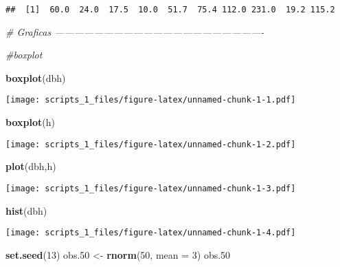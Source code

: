 \documentclass[
]{article}
\newenvironment{Shaded}{\begin{snugshade}}{\end{snugshade}}
\newcommand{\CommentTok}[1]{\textcolor[rgb]{0.56,0.35,0.01}{\textit{#1}}}
\newcommand{\DataTypeTok}[1]{\textcolor[rgb]{0.13,0.29,0.53}{#1}}
\newcommand{\DecValTok}[1]{\textcolor[rgb]{0.00,0.00,0.81}{#1}}
\newcommand{\FloatTok}[1]{\textcolor[rgb]{0.00,0.00,0.81}{#1}}
\newcommand{\KeywordTok}[1]{\textcolor[rgb]{0.13,0.29,0.53}{\textbf{#1}}}
\newcommand{\NormalTok}[1]{#1}
\newcommand{\StringTok}[1]{\textcolor[rgb]{0.31,0.60,0.02}{#1}}
\begin{document}
\begin{verbatim}
##  [1]  60.0  24.0  17.5  10.0  51.7  75.4 112.0 231.0  19.2 115.2
\end{verbatim}

\begin{Shaded}
\begin{Highlighting}[]
\CommentTok{# Graficas ----------------------------------------------------------------}


\CommentTok{#boxplot}

\KeywordTok{boxplot}\NormalTok{(dbh)}
\end{Highlighting}
\end{Shaded}

\texttt{[image: scripts\_1\_files/figure-latex/unnamed-chunk-1-1.pdf]}

\begin{Shaded}
\begin{Highlighting}[]
\KeywordTok{boxplot}\NormalTok{(h)}
\end{Highlighting}
\end{Shaded}

\texttt{[image: scripts\_1\_files/figure-latex/unnamed-chunk-1-2.pdf]}

\begin{Shaded}
\begin{Highlighting}[]
\KeywordTok{plot}\NormalTok{(dbh,h)}
\end{Highlighting}
\end{Shaded}

\texttt{[image: scripts\_1\_files/figure-latex/unnamed-chunk-1-3.pdf]}

\begin{Shaded}
\begin{Highlighting}[]
\KeywordTok{hist}\NormalTok{(dbh)}
\end{Highlighting}
\end{Shaded}

\texttt{[image: scripts\_1\_files/figure-latex/unnamed-chunk-1-4.pdf]}

\begin{Shaded}
\begin{Highlighting}[]
\KeywordTok{set.seed}\NormalTok{(}\DecValTok{13}\NormalTok{)}
\NormalTok{obs}\FloatTok{.50}\NormalTok{ <-}\StringTok{ }\KeywordTok{rnorm}\NormalTok{(}\DecValTok{50}\NormalTok{, }\DataTypeTok{mean =} \DecValTok{3}\NormalTok{)}
\NormalTok{obs}\FloatTok{.50}
\end{Highlighting}
\end{Shaded}
\end{document}
